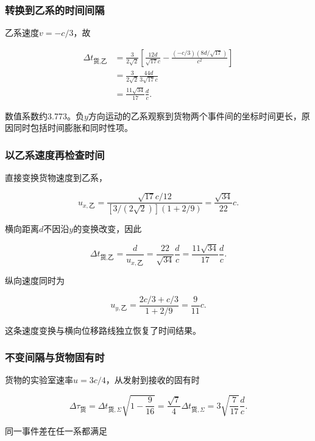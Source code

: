 \documentclass[12pt,a4paper,fontset=fandol]{ctexart}
\begin{document}
\subsubsection{转换到乙系的时间间隔}\label{ux8f6cux6362ux5230ux4e59ux7cfbux7684ux65f6ux95f4ux95f4ux9694}

乙系速度\(v=-c/3\)，故

\[
\begin{aligned}
\Delta t_{\text{货},\text{乙}}
&=\frac3{2\sqrt2}
\left[
\frac{12d}{\sqrt{17}c}
-\frac{(-c/3)(8d/\sqrt{17})}{c^2}
\right]\\
&=\frac3{2\sqrt2}
\frac{44d}{3\sqrt{17}c}\\
&=\boxed{\frac{11\sqrt{34}}{17}\frac dc}.
\end{aligned}
\]

数值系数约3.773。负\(y\)方向运动的乙系观察到货物两个事件间的坐标时间更长，原因同时包括时间膨胀和同时性项。

\subsubsection{以乙系速度再检查时间}\label{ux4ee5ux4e59ux7cfbux901fux5ea6ux518dux68c0ux67e5ux65f6ux95f4}

直接变换货物速度到乙系，

\[
u_{x,\text{乙}}
=\frac{\sqrt{17}c/12}
{[3/(2\sqrt2)](1+2/9)}
=\frac{\sqrt{34}}{22}c.
\]

横向距离\(d\)不因沿\(y\)的变换改变，因此

\[
\Delta t_{\text{货},\text{乙}}
=\frac d{u_{x,\text{乙}}}
=\frac{22}{\sqrt{34}}\frac dc
=\frac{11\sqrt{34}}{17}\frac dc.
\]

纵向速度同时为

\[
u_{y,\text{乙}}
=\frac{2c/3+c/3}{1+2/9}
=\frac9{11}c.
\]

这条速度变换与横向位移路线独立恢复了时间结果。

\subsubsection{不变间隔与货物固有时}\label{ux4e0dux53d8ux95f4ux9694ux4e0eux8d27ux7269ux56faux6709ux65f6}

货物的实验室速率\(u=3c/4\)，从发射到接收的固有时

\[
\Delta\tau_{\text{货}}
=\Delta t_{\text{货},\Sigma}\sqrt{1-\frac9{16}}
=\frac{\sqrt7}{4}\Delta t_{\text{货},\Sigma}
=3\sqrt{\frac7{17}}\frac dc.
\]

同一事件差在任一系都满足
\end{document}
